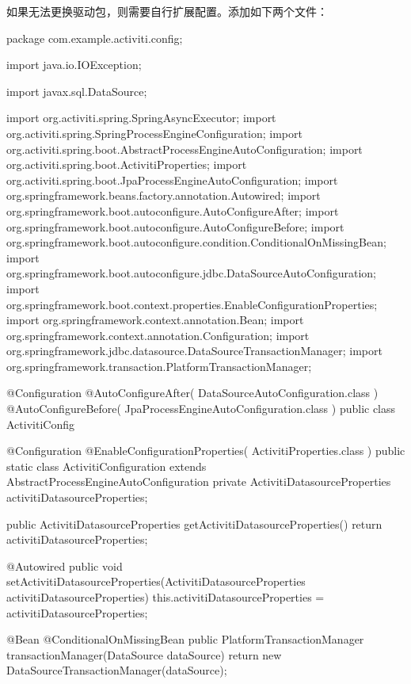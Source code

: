\documentclass[a4,10pt,oneside,english]{sphinxmanual}
\begin{document}
如果无法更换驱动包，则需要自行扩展配置。添加如下两个文件：


\begin{sphinxVerbatim}[commandchars=\\\{\}]
package com.example.activiti.config;

import java.io.IOException;

import javax.sql.DataSource;

import org.activiti.spring.SpringAsyncExecutor;
import org.activiti.spring.SpringProcessEngineConfiguration;
import org.activiti.spring.boot.AbstractProcessEngineAutoConfiguration;
import org.activiti.spring.boot.ActivitiProperties;
import org.activiti.spring.boot.JpaProcessEngineAutoConfiguration;
import org.springframework.beans.factory.annotation.Autowired;
import org.springframework.boot.autoconfigure.AutoConfigureAfter;
import org.springframework.boot.autoconfigure.AutoConfigureBefore;
import org.springframework.boot.autoconfigure.condition.ConditionalOnMissingBean;
import org.springframework.boot.autoconfigure.jdbc.DataSourceAutoConfiguration;
import org.springframework.boot.context.properties.EnableConfigurationProperties;
import org.springframework.context.annotation.Bean;
import org.springframework.context.annotation.Configuration;
import org.springframework.jdbc.datasource.DataSourceTransactionManager;
import org.springframework.transaction.PlatformTransactionManager;

@Configuration
@AutoConfigureAfter(\PYGZob{} DataSourceAutoConfiguration.class \PYGZcb{})
@AutoConfigureBefore(\PYGZob{} JpaProcessEngineAutoConfiguration.class \PYGZcb{})
public class ActivitiConfig \PYGZob{}

   @Configuration
   @EnableConfigurationProperties(\PYGZob{} ActivitiProperties.class \PYGZcb{})
   public static class ActivitiConfiguration extends AbstractProcessEngineAutoConfiguration \PYGZob{}
      private ActivitiDatasourceProperties activitiDatasourceProperties;

      public ActivitiDatasourceProperties getActivitiDatasourceProperties() \PYGZob{}
         return activitiDatasourceProperties;
      \PYGZcb{}

      @Autowired
      public void setActivitiDatasourceProperties(ActivitiDatasourceProperties activitiDatasourceProperties) \PYGZob{}
         this.activitiDatasourceProperties = activitiDatasourceProperties;
      \PYGZcb{}

      @Bean
      @ConditionalOnMissingBean
      public PlatformTransactionManager transactionManager(DataSource dataSource) \PYGZob{}
         return new DataSourceTransactionManager(dataSou\PYGZhy{}rce);
      \PYGZcb{}


\end{sphinxVerbatim}
\end{document}
